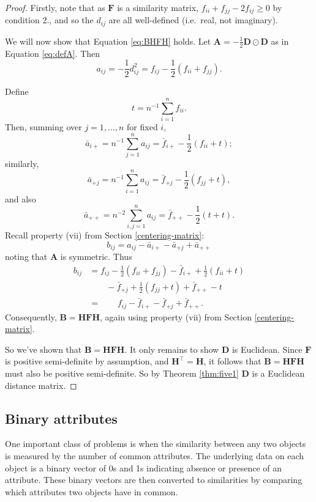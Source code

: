 \documentclass[]{book}
\theoremstyle{definition}
\theoremstyle{definition}
\theoremstyle{definition}
\theoremstyle{remark}
\begin{document}
\begin{proof}
{}
Firstly, note that as \(\mathbf F\) is a similarity matrix, \(f_{ii}+f_{jj}-2f_{ij}\geq 0\) by condition 2., and so the \(d_{ij}\) are all well-defined (i.e.~real, not imaginary).

We will now show that Equation \eqref{eq:BHFH} holds. Let \(\mathbf A= -\frac{1}{2}\mathbf D\odot \mathbf D\) as in Equation \eqref{eq:defA}. Then
\[
a_{ij}=-\frac{1}{2}d_{ij}^2 =f_{ij}-\frac{1}{2}(f_{ii}+f_{jj}).
\]

Define
\[
t=n^{-1}\sum_{i=1}^n f_{ii}.
\]
Then, summing over \(j=1, \ldots , n\) for fixed \(i\),
\[
\bar{a}_{i+}=n^{-1}\sum_{j=1}^n a_{ij} = \bar{f}_{i+}-\frac{1}{2}(f_{ii}+t);
\]
similarly,
\[
\bar{a}_{+j}=n^{-1}\sum_{i=1}^n a_{ij}=\bar{f}_{+j}-\frac{1}{2}(f_{jj}+t),
\]
and also
\[
\bar{a}_{++}=n^{-2}\sum_{i,j=1}^n a_{ij}=\bar{f}_{++}-\frac{1}{2}(t+t).
\]
Recall property (vii) from Section \ref{centering-matrix}:
\[
b_{ij}=a_{ij}-\bar{a}_{i+}-\bar{a}_{+j}+\bar{a}_{++}
\]
noting that \(\mathbf A\) is symmetric. Thus
\begin{align*} 
b_{ij}&=f_{ij}-\frac{1}{2}(f_{ii}+f_{jj})-\bar{f}_{i+}+\frac{1}{2}(f_{ii}+t)\\
& \qquad -\bar{f}_{+j}+\frac{1}{2}(f_{jj}+t) +\bar{f}_{++}-t\\
& =\qquad f_{ij}-\bar{f}_{i+}-\bar{f}_{+j}+\bar{f}_{++}.
\end{align*}
Consequently, \(\mathbf B=\mathbf H\mathbf F\mathbf H\), again using property (vii) from Section \ref{centering-matrix}.

So we've shown that \(\mathbf B= \mathbf H\mathbf F\mathbf H\). It only remains to show \(\mathbf D\) is Euclidean. Since \(\mathbf F\) is positive semi-definite by assumption, and \(\mathbf H^\top =\mathbf H\), it follows that \(\mathbf B=\mathbf H\mathbf F\mathbf H\) must also be positive semi-definite. So by Theorem \ref{thm:five1} \(\mathbf D\) is a Euclidean distance matrix.
\end{proof}

\hypertarget{binary-attributes}{%
\subsection{Binary attributes}\label{binary-attributes}}

One important class of problems is when the similarity between any two objects is measured by the number of common attributes. The underlying data on each object is a binary vector of 0s and 1s indicating absence or presence of an attribute. These binary vectors are then converted to similarities by comparing which attributes two objects have in common.
\end{document}
